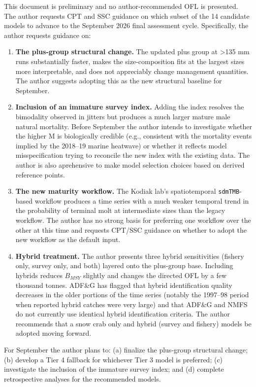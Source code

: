 \documentclass[
]{article}
\begin{document}
This document is preliminary and no author-recommended OFL is presented. The author requests CPT and SSC guidance on which subset of the 14 candidate models to advance to the September 2026 final assessment cycle. Specifically, the author requests guidance on:

\begin{enumerate}
\def\labelenumi{\arabic{enumi}.}
\item
  \textbf{The plus-group structural change.} The updated plus group at \textgreater135 mm runs substantially faster, makes the size-composition fits at the largest sizes more interpretable, and does not appreciably change management quantities. The author suggests adopting this as the new structural baseline for September.
\item
  \textbf{Inclusion of an immature survey index.} Adding the index resolves the bimodality observed in jitters but produces a much larger mature male natural mortality. Before September the author intends to investigate whether the higher M is biologically credible (e.g., consistent with the mortality events implied by the 2018--19 marine heatwave) or whether it reflects model misspecification trying to reconcile the new index with the existing data. The author is also aprehensive to make model selection choices based on derived reference points.
\item
  \textbf{The new maturity workflow.} The Kodiak lab's spatiotemporal \texttt{sdmTMB}-based workflow produces a time series with a much weaker temporal trend in the probability of terminal molt at intermediate sizes than the legacy workflow. The author has no strong basis for preferring one workflow over the other at this time and requests CPT/SSC guidance on whether to adopt the new workflow as the default input.
\item
  \textbf{Hybrid treatment.} The author presents three hybrid sensitivities (fishery only, survey only, and both) layered onto the plus-group base. Including hybrids reduces \(B_{MSY}\) slightly and changes the directed OFL by a few thousand tonnes. ADF\&G has flagged that hybrid identification quality decreases in the older portions of the time series (notably the 1997--98 period when reported hybrid catches were very large) and that ADF\&G and NMFS do not currently use identical hybrid identification criteria. The author recommends that a snow crab only and hybrid (survey and fishery) models be adopted moving forward.
\end{enumerate}

For September the author plans to: (a) finalize the plus-group structural change; (b) develop a Tier 4 fallback for whichever Tier 3 model is preferred; (c) investigate the inclusion of the immature survey index; and (d) complete retrospective analyses for the recommended models.
\end{document}
